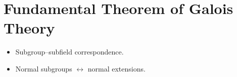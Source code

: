 \section{Fundamental Theorem of Galois Theory}
\begin{itemize}
  \item Subgroup--subfield correspondence.
  \item Normal subgroups $\leftrightarrow$ normal extensions.
\end{itemize}
